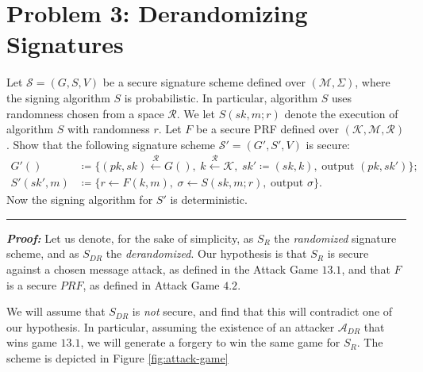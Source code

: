 \section{Problem 3: Derandomizing Signatures}\label{sec:problem3}

Let $\mathcal{S} = (G, S, V)$ be a secure signature scheme defined over $(\mathcal{M}, \Sigma)$, where the signing algorithm $S$ is probabilistic.
In particular, algorithm $S$ uses randomness chosen from a space $\mathcal{R}$.
We let $S(sk,m;r)$ denote the execution of algorithm $S$ with randomness $r$.
Let $F$ be a secure PRF defined over $(\mathcal{K}, \mathcal{M}, \mathcal{R})$.
Show that the following signature scheme $\mathcal{S'} = (G', S', V)$ is secure:
\begin{equation*}
    \begin{split}
        G'() &\coloneqq \{ (pk, sk) \overset{\mathcal{R}}{\longleftarrow} G(), 
            \hspace{3pt} k \overset{\mathcal{R}}{\longleftarrow} \mathcal{K}, 
            \hspace{3pt} sk' \coloneqq (sk, k), 
            \hspace{3pt} \text{output } (pk, sk') \}; \\
        S'(sk', m) &\coloneqq \{ r \longleftarrow F(k, m),
            \hspace{3pt} \sigma \longleftarrow S(sk, m; r),
            \hspace{3pt} \text{output } \sigma \}.
    \end{split}
\end{equation*}
Now the signing algorithm for $S'$ is deterministic.

\begin{center}
    \rule{5cm}{0.4pt}
\end{center}

\textbf{\textit{Proof:}}
Let us denote, for the sake of simplicity, as $S_{R}$ the \textit{randomized} signature scheme, and as $S_{DR}$ the \textit{derandomized}.
Our hypothesis is that $S_R$ is secure against a chosen message attack, as defined in the Attack Game $13.1$, and that $F$ is a secure $PRF$, as defined in Attack Game $4.2$.

We will assume that $S_{DR}$ is \emph{not} secure, and find that this will contradict one of our hypothesis.
In particular, assuming the existence of an attacker $\mathcal{A}_{DR}$ that wins game $13.1$, we will generate a forgery to win the same game for $S_R$.
The scheme is depicted in Figure \ref{fig:attack-game}

